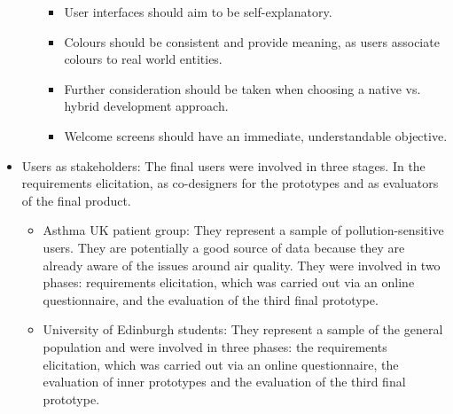\begin{itemize}
\begin{itemize}
\begin{itemize}
        \item User interfaces should aim to be self-explanatory. 
        \item Colours should be consistent and provide meaning, as users associate colours to real world entities.
        \item Further consideration should be taken when choosing a native vs. hybrid development approach.
        \item Welcome screens should have an immediate, understandable objective.   
    \end{itemize}

\end{itemize}
    
    \item Users as stakeholders: The final users were involved in three stages. In the requirements elicitation, as co-designers for the prototypes and as evaluators of the final product. 
    \begin{itemize}
            \item Asthma UK patient group: They represent a sample of pollution-sensitive users. They are potentially a good source of data because they are already aware of the issues around air quality. They were involved in two phases: requirements elicitation, which was carried out via an online questionnaire, and the evaluation of the third final prototype.
            \item University of Edinburgh students: They represent a sample of the general population and were involved in three phases: the requirements elicitation, which was carried out via an online questionnaire, the evaluation of inner prototypes and the evaluation of the third final prototype. 
    \end{itemize}
\end{itemize}

